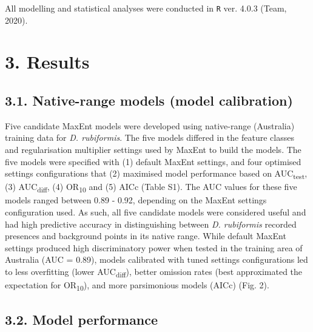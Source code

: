 \documentclass[12pt,]{article}
\begin{document}
All modelling and statistical analyses were conducted in \texttt{R} ver.
4.0.3 (Team, 2020).

\hypertarget{results}{%
\section{3. Results}\label{results}}

\hypertarget{native-range-models-model-calibration}{%
\subsection{3.1. Native-range models (model
calibration)}\label{native-range-models-model-calibration}}

Five candidate MaxEnt models were developed using native-range
(Australia) training data for \emph{D. rubiformis}. The five models
differed in the feature classes and regularisation multiplier settings
used by MaxEnt to build the models. The five models were specified with
(1) default MaxEnt settings, and four optimised settings configurations
that (2) maximised model performance based on AUC\textsubscript{test},
(3) AUC\textsubscript{diff}, (4) OR\textsubscript{10} and (5) AICc
(Table S1). The AUC values for these five models ranged between 0.89 -
0.92, depending on the MaxEnt settings configuration used. As such, all
five candidate models were considered useful and had high predictive
accuracy in distinguishing between \emph{D. rubiformis} recorded
presences and background points in its native range. While default
MaxEnt settings produced high discriminatory power when tested in the
training area of Australia (AUC = 0.89), models calibrated with tuned
settings configurations led to less overfitting (lower
AUC\textsubscript{diff}), better omission rates (best approximated the
expectation for OR\textsubscript{10}), and more parsimonious models
(AICc) (Fig. 2).

\hypertarget{model-performance}{%
\subsection{3.2. Model performance}\label{model-performance}}
\end{document}
